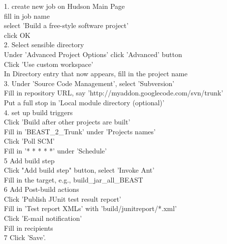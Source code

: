 \documentclass{article}
\begin{document}
1. create new job on Hudson Main Page\\
fill in job name\\
select 'Build a free-style software project'\\
click OK\\
2. Select sensible directory\\
Under 'Advanced Project Options' click 'Advanced' button\\
Click 'Use custom workspace'\\
In Directory entry that now appears, fill in the project name\\
3. Under 'Source Code Management', select 'Subversion'\\
Fill in repository URL, say 'http://myaddon.googlecode.com/svn/trunk'\\
Put a full stop in 'Local module directory (optional)'\\
4. set up build triggers\\
Click 'Build after other projects are built'\\
Fill in 'BEAST_2_Trunk' under 'Projects names'\\
Click 'Poll SCM'\\
Fill in '* * * * *' under 'Schedule'\\
5 Add build step\\
Click "Add build step" button, select 'Invoke Ant'\\
Fill in the target, e.g., build_jar_all_BEAST\\
6 Add Post-build actions\\
Click 'Publish JUnit test result report'\\
Fill in 'Test report XMLs' with 'build/junitreport/*.xml'\\
Click 'E-mail notification'\\
Fill in recipients\\
7 Click 'Save'.
\end{document}
